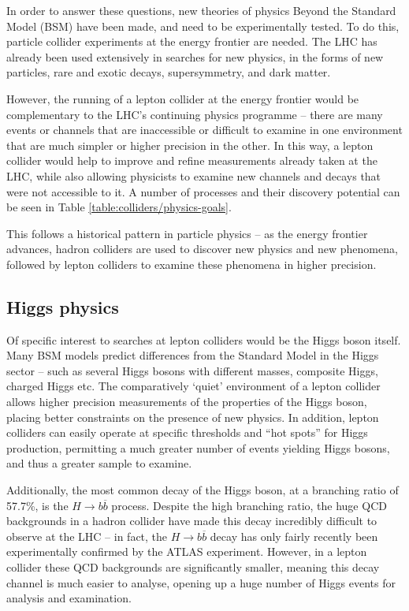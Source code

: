 In order to answer these questions, new theories of physics Beyond the Standard Model (\acrshort{BSM}) have been made, and need to be experimentally tested. To do this, particle collider experiments at the energy frontier are needed. The \acrfull{LHC} has already been used extensively in searches for new physics, in the forms of new particles, rare and exotic decays, supersymmetry, and dark matter.

However, the running of a lepton collider at the energy frontier would be complementary to the \acrshort{LHC}'s continuing physics programme -- there are many events or channels that are inaccessible or difficult to examine in one environment that are much simpler or higher precision in the other. In this way, a lepton collider would help to improve and refine measurements already taken at the \acrshort{LHC}, while also allowing physicists to examine new channels and decays that were not accessible to it. A number of processes and their discovery potential can be seen in Table \ref{table:colliders/physics-goals}.

This follows a historical pattern in particle physics -- as the energy frontier advances, hadron colliders are used to discover new physics and new phenomena, followed by lepton colliders to examine these phenomena in higher precision.

\subsection{Higgs physics}
Of specific interest to searches at lepton colliders would be the Higgs boson itself. Many \acrshort{BSM} models predict differences from the Standard Model in the Higgs sector -- such as several Higgs bosons with different masses, composite Higgs, charged Higgs etc. The comparatively `quiet' environment of a lepton collider allows higher precision measurements of the properties of the Higgs boson, placing better constraints on the presence of new physics. In addition, lepton colliders can easily operate at specific thresholds and ``hot spots'' for Higgs production, permitting a much greater number of events yielding Higgs bosons, and thus a greater sample to examine.

Additionally, the most common decay of the Higgs boson, at a branching ratio of 57.7\%, is the $H \rightarrow b \overline{b}$ process. Despite the high branching ratio, the huge \acrshort{QCD} backgrounds in a hadron collider have made this decay incredibly difficult to observe at the LHC -- in fact, the $H \rightarrow b \overline{b}$ decay has only fairly recently been experimentally confirmed by the \acrshort{ATLAS} experiment. However, in a lepton collider these \acrshort{QCD} backgrounds are significantly smaller, meaning this decay channel is much easier to analyse, opening up a huge number of Higgs events for analysis and examination.

